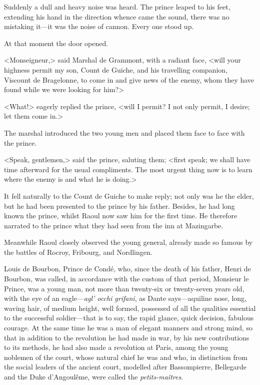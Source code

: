 Suddenly a dull and heavy noise was heard. The prince leaped to his feet, extending his hand in the direction whence came the sound, there was no mistaking it—it was the noise of cannon. Every one stood up.

At that moment the door opened.

<Monseigneur,> said Marshal de Grammont, with a radiant face, <will your highness permit my son, Count de Guiche, and his travelling companion, Viscount de Bragelonne, to come in and give news of the enemy, whom they have found while we were looking for him?>

<What!> eagerly replied the prince, <will I permit? I not only permit, I desire; let them come in.>

The marshal introduced the two young men and placed them face to face with the prince.

<Speak, gentlemen,> said the prince, saluting them; <first speak; we shall have time afterward for the usual compliments. The most urgent thing now is to learn where the enemy is and what he is doing.>

It fell naturally to the Count de Guiche to make reply; not only was he the elder, but he had been presented to the prince by his father. Besides, he had long known the prince, whilst Raoul now saw him for the first time. He therefore narrated to the prince what they had seen from the inn at Mazingarbe.

Meanwhile Raoul closely observed the young general, already made so famous by the battles of Rocroy, Fribourg, and Nordlingen.

Louis de Bourbon, Prince de Condé, who, since the death of his father, Henri de Bourbon, was called, in accordance with the custom of that period, Monsieur le Prince, was a young man, not more than twenty-six or twenty-seven years old, with the eye of an eagle—\textit{agl' occhi grifani}, as Dante says—aquiline nose, long, waving hair, of medium height, well formed, possessed of all the qualities essential to the successful soldier—that is to say, the rapid glance, quick decision, fabulous courage. At the same time he was a man of elegant manners and strong mind, so that in addition to the revolution he had made in war, by his new contributions to its methods, he had also made a revolution at Paris, among the young noblemen of the court, whose natural chief he was and who, in distinction from the social leaders of the ancient court, modelled after Bassompierre, Bellegarde and the Duke d'Angoulême, were called the \textit{petits-maîtres}.

